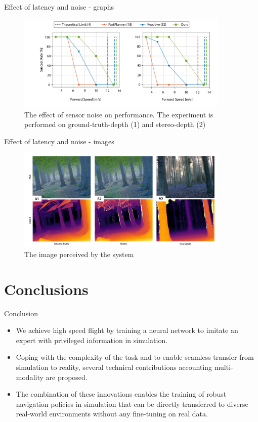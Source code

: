 \documentclass{beamer}
\begin{document}
\begin{frame}{Effect of latency and noise - graphs}
	\begin{figure}
		\includegraphics[width=4in]{noise-graph.png}
		\caption{The effect of sensor noise on performance. The experiment is performed on ground-truth-depth (1) and stereo-depth (2)}
	\end{figure}
\end{frame}

\begin{frame}{Effect of latency and noise - images}
	\begin{figure}
		\includegraphics[width=4in]{stimulation and stereo.png}
		\caption{The image perceived by the system}
	\end{figure}
\end{frame}

\section{Conclusions}
\begin{frame}{Conclusion}
	\begin{itemize}
		\item We achieve high speed flight by training a neural network to imitate an expert with privileged information in simulation.
		
		\item Coping with the complexity of the task and to enable seamless transfer from simulation to reality, several technical contributions accounting multi-modality are proposed.
		
		\item The combination of these innovations enables the training of robust navigation policies in simulation that can be directly transferred to diverse real-world environments without any fine-tuning on real data.
	\end{itemize}
	
	
\end{frame}
\end{document}
